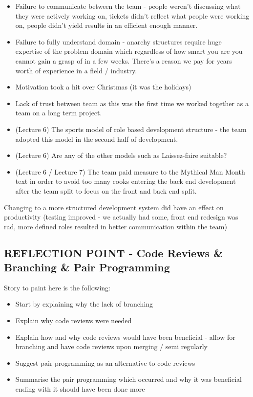 \documentclass{l3proj}
\begin{document}
\begin{itemize}
\item Failure to communicate between the team - people weren’t discussing what they were actively working on, tickets didn’t reflect what people were working on, people didn’t yield results in an efficient enough manner.
\item Failure to fully understand domain - anarchy structures require huge expertise of the problem domain which regardless of how smart you are you cannot gain a grasp of in a few weeks. There’s a reason we pay for years worth of experience in a field / industry.
\item Motivation took a hit over Christmas (it was the holidays)
\item Lack of trust between team as this was the first time we worked together as a team on a long term project.
\item (Lecture 6) The sports model of role based development structure - the team adopted this model in the second half of development.
\item (Lecture 6) Are any of the other models such as Laissez-faire suitable?
\item (Lecture 6 / Lecture 7) The team paid measure to the Mythical Man Month text in order to avoid too many cooks entering the back end development after the team split to focus on the front and back end split.
\end{itemize}

Changing to a more structured development system did have an effect on productivity (testing improved - we actually had some, front end redesign was rad, more defined roles resulted in better communication within the team)


\subsection{REFLECTION POINT - Code Reviews \& Branching \& Pair Programming}
\label{sec:codereviewbranch}

Story to paint here is the following:
\begin{itemize}
\item Start by explaining why the lack of branching
\item Explain why code reviews were needed
\item Explain how and why code reviews would have been beneficial - allow for branching and have code reviews upon merging / semi regularly
\item Suggest pair programming as an alternative to code reviews
\item Summarise the pair programming which occurred and why it was beneficial ending with it should have been done more
\end{itemize}
\end{document}
